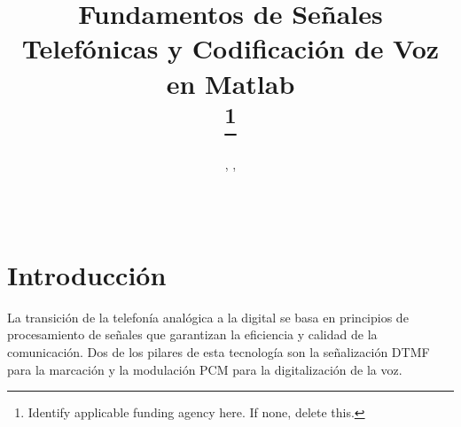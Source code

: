 \documentclass[journal]{IEEEtran} %
\begin{document}
\title{Fundamentos de Señales Telefónicas y Codificación de Voz en Matlab \\
\thanks{Identify applicable funding agency here. If none, delete this.}
}

\author{%
    , %
    , %
    \\%
    \\%
    \\%
}

\maketitle



\section{Introducción}
La transición de la telefonía analógica a la digital se basa en principios de procesamiento de señales que garantizan la eficiencia y calidad de la comunicación. Dos de los pilares de esta tecnología son la señalización DTMF para la marcación y la modulación PCM para la digitalización de la voz.
\end{document}
